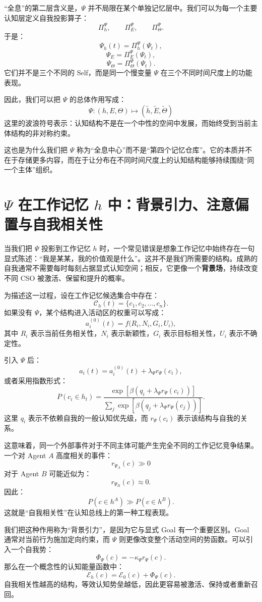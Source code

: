 “全息”的第二层含义是，$\Psi$ 并不局限在某个单独记忆层中。我们可以为每一个主要认知层定义自我投影算子：
\[
\Pi_h^\Psi,\qquad
\Pi_E^\Psi,\qquad
\Pi_\Theta^\Psi.
\]
于是：
\[
\Psi_h(t)
=
\Pi_h^\Psi(\Psi_t),
\]
\[
\Psi_E
=
\Pi_E^\Psi(\Psi_t),
\]
\[
\Psi_\Theta
=
\Pi_\Theta^\Psi(\Psi_t).
\]
它们并不是三个不同的 Self，而是同一个慢变量 $\Psi$ 在三个不同时间尺度上的功能表现。

因此，我们可以把 $\Psi$ 的总体作用写成：
\[
\boxed{
\Psi
:
(h,E,\Theta)
\mapsto
(\tilde h,\tilde E,\tilde\Theta)
}
\]
这里的波浪符号表示：认知结构不是在一个中性的空间中发展，而始终受到当前主体结构的非对称约束。

这也是为什么我们把 $\Psi$ 称为“全息中心”而不是“第四个记忆仓库”。它的本质并不在于存储更多内容，而在于让分布在不同时间尺度上的认知结构能够持续围绕“同一个主体”组织。


\section{$\Psi$ 在工作记忆 $h$ 中：背景引力、注意偏置与自我相关性}

当我们把 $\Psi$ 投影到工作记忆 $h$ 时，一个常见错误是想象工作记忆中始终存在一句显式陈述：“我是某某，我的价值观是什么”。这并不是我们所需要的结构。成熟的自我通常不需要每时每刻占据显式认知空间；相反，它更像一个\textbf{背景场}，持续改变不同 CSO 被激活、保留和提升的概率。

为描述这一过程，设在工作记忆候选集合中存在：
\[
\mathcal C_h(t)
=
\{c_1,c_2,\ldots,c_n\}.
\]
如果没有 $\Psi$，某个结构进入活动区的权重可以写成：
\[
a_i^{(0)}(t)
=
f\bigl(
R_i,
N_i,
G_i,
U_i
\bigr),
\]
其中 $R_i$ 表示当前任务相关性，$N_i$ 表示新颖性，$G_i$ 表示目标相关性，$U_i$ 表示不确定性。

引入 $\Psi$ 后：
\[
a_i(t)
=
a_i^{(0)}(t)
+
\lambda_\Psi r_\Psi(c_i),
\]
或者采用指数形式：
\[
P(c_i\in h_t)
=
\frac{
\exp\left[
\beta
\left(
q_i+\lambda_\Psi r_\Psi(c_i)
\right)
\right]
}{
\sum_j
\exp\left[
\beta
\left(
q_j+\lambda_\Psi r_\Psi(c_j)
\right)
\right]
}.
\]
这里 $q_i$ 表示不依赖自我的一般认知优先级，而 $r_\Psi(c_i)$ 表示该结构与自我的关系。

这意味着，同一个外部事件对于不同主体可能产生完全不同的工作记忆竞争结果。一个对 Agent $A$ 高度相关的事件：
\[
r_{\Psi_A}(c)\gg 0
\]
对于 Agent $B$ 可能近似为：
\[
r_{\Psi_B}(c)\approx 0.
\]
因此：
\[
P(c\in h^A)
\gg
P(c\in h^B).
\]
这就是“自我相关性”在认知总线上的第一种工程表现。

我们把这种作用称为“背景引力”，是因为它与显式 Goal 有一个重要区别。Goal 通常对当前行为施加定向约束，而 $\Psi$ 则更像改变整个活动空间的势函数。可以引入一个自我势：
\[
\Phi_\Psi(c)
=
-\kappa_\Psi r_\Psi(c).
\]
那么在一个概念性的认知能量函数中：
\[
\mathcal E_h(c)
=
\mathcal E_0(c)
+
\Phi_\Psi(c).
\]
自我相关性越高的结构，等效认知势垒越低，因此更容易被激活、保持或者重新召回。

